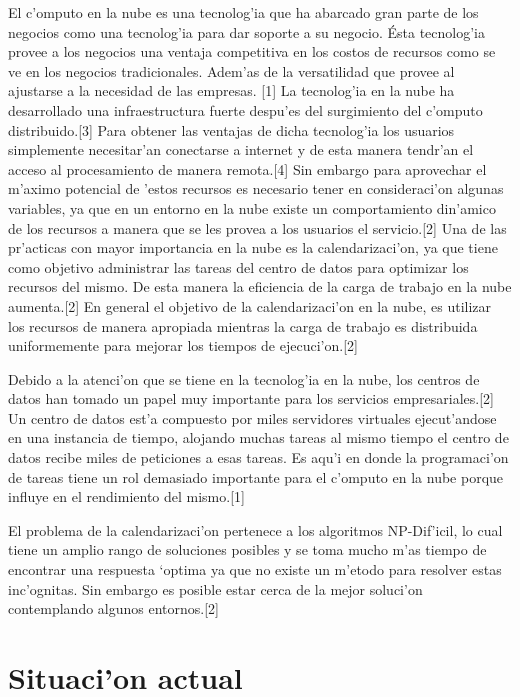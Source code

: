 El c'omputo en la nube es una tecnolog'ia que ha abarcado gran parte de los negocios como una tecnolog'ia para dar soporte a su negocio. Ésta tecnolog'ia provee a los negocios una ventaja competitiva en los costos de recursos como se ve en los negocios tradicionales. Adem'as de la versatilidad que provee al ajustarse a la necesidad de las empresas. [1]
La tecnolog'ia en la nube ha desarrollado una infraestructura fuerte despu'es del surgimiento del c'omputo distribuido.[3] Para obtener las ventajas de dicha tecnolog'ia los usuarios simplemente necesitar'an conectarse a internet y de esta manera tendr'an el acceso al procesamiento de manera remota.[4] Sin embargo para aprovechar el m'aximo potencial de 'estos recursos es necesario tener en consideraci'on algunas variables, ya que en un entorno en la nube existe un comportamiento din'amico de los recursos a manera que se les provea a los usuarios el servicio.[2]
Una de las pr'acticas con mayor importancia en la nube es la calendarizaci'on, ya que tiene como objetivo  administrar las tareas del centro de datos para optimizar los recursos del mismo. De esta manera la eficiencia de la carga de trabajo en la nube aumenta.[2]
En general el objetivo de la calendarizaci'on en la nube, es utilizar los recursos de manera apropiada mientras la carga de trabajo es distribuida uniformemente para mejorar los tiempos de ejecuci'on.[2]

Debido a la atenci'on que se tiene en la tecnolog'ia en la nube, los centros de datos han tomado un papel muy importante para los servicios empresariales.[2] Un centro de datos est'a compuesto por miles servidores virtuales ejecut'andose en una instancia de tiempo, alojando muchas tareas al mismo tiempo el centro de datos recibe miles de peticiones a esas tareas. Es aqu'i en donde la programaci'on de tareas tiene un rol demasiado importante para el c'omputo en la nube porque influye en el rendimiento del mismo.[1] 

El problema de la calendarizaci'on pertenece a los algoritmos NP-Dif'icil, lo cual tiene un amplio rango de soluciones posibles y se toma mucho m'as tiempo de encontrar una respuesta ‘optima ya que no existe un m'etodo para resolver estas inc'ognitas. Sin embargo es posible estar cerca de la mejor soluci'on contemplando algunos entornos.[2]

\section*{Situaci'on actual}

